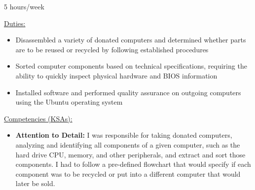 \documentclass[11pt]{article}
\def\competencies{
    \toplistspacing
    \underline{Competencies (KSAs):}
    \toplistspacing
}
\def\duties{
    \toplistspacing
    \underline{Duties:}
    \toplistspacing
}
\newcommand{\sectionendspace}{
    \vspace{0.1in}
}
\newcommand{\toplistspacing}{
    \vspace{0.04in}
}
\begin{document}
    {5 hours/week}{}
    \duties
    \begin{itemize}[noitemsep,nolistsep]
        \item Disassembled a variety of donated computers and determined whether parts are to be reused or recycled by following established procedures
        \item Sorted computer components based on technical specifications, requiring the ability to quickly inspect physical hardware and BIOS information
        \item Installed software and performed quality assurance on outgoing computers using the Ubuntu operating system
    \end{itemize}
    \competencies
    \begin{itemize}[noitemsep,nolistsep]
        \item \textbf{Attention to Detail:} I was responsible for taking donated computers, analyzing and identifying all components of a given computer, such as the hard drive CPU, memory, and other peripherals, and extract and sort those components.
        I had to follow a pre-defined flowchart that would specify if each component was to be recycled or put into a different computer that would later be sold.
    \end{itemize}
    \sectionendspace
\end{document}
